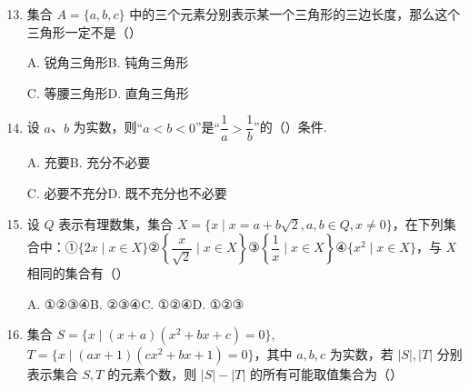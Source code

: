 \begin{enumerate}
\setcounter{enumi}{12}

\item 集合 $A=\{a,b,c\}$ 中的三个元素分别表示某一个三角形的三边长度，那么这个三角形一定不是\mbox{（\quad）}

\keepwithprev
A. 锐角三角形\qquad B. 钝角三角形

C. 等腰三角形\qquad D. 直角三角形

\ifanswer
{}
\fi

\item 设 $a$、$b$ 为实数，则“$a<b<0$”是“$\dfrac1a>\dfrac1b$”的\mbox{（\quad）}条件.

\keepwithprev
A. 充要\qquad B. 充分不必要

C. 必要不充分\qquad D. 既不充分也不必要

\ifanswer
\solbegin
{}
\solend
\fi

\item 设 $Q$ 表示有理数集，集合 $X=\{x\mid x=a+b\sqrt2,a,b\in Q,x\neq0\}$，在下列集合中：①$\{2x\mid x\in X\}$②$\left\{\dfrac{x}{\sqrt2}\mid x\in X\right\}$③$\left\{\dfrac1x\mid x\in X\right\}$④$\{x^2\mid x\in X\}$，与 $X$ 相同的集合有\mbox{（\quad）}

\keepwithprev
A. ①②③④\qquad B. ②③④\qquad C. ①②④\qquad D. ①②③

\ifanswer
\solbegin
{}
\solend
\fi

\item 集合 $S=\{x\mid(x+a)(x^2+bx+c)=0\}$,$T=\{x\mid(ax+1)(cx^2+bx+1)=0\}$，其中 $a,b,c$ 为实数，若 $|S|,|T|$ 分别表示集合 $S,T$ 的元素个数，则 $|S|-|T|$ 的所有可能取值集合为\mbox{（\quad）}


\end{enumerate}
